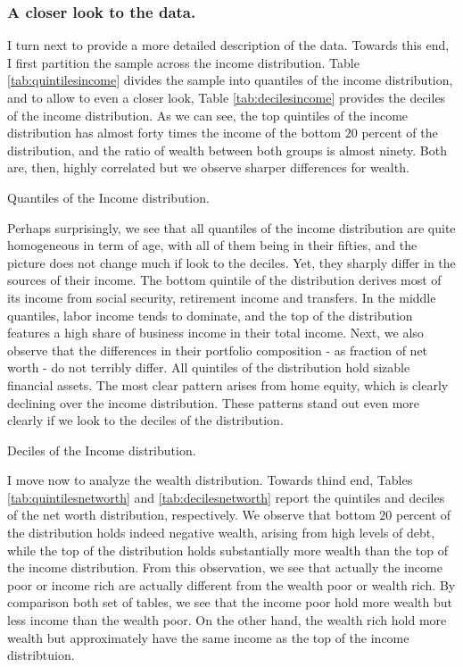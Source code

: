 \documentclass[11pt, a4paper, leqno]{article}
\begin{document}
\subsubsection*{A closer look to the data.}

I turn next to provide a more detailed description of the data. Towards this end, I first partition the sample across the income distribution. Table \ref*{tab:quintilesincome} divides the sample into quantiles of the income distribution, and to allow to even a closer look, Table \ref*{tab:decilesincome} provides the deciles of the income distribution. As we can see, the top quintiles of the income distribution has almost forty times the income of the bottom $20$ percent of the distribution, and the ratio of wealth between both groups is almost ninety. Both are, then, highly correlated but we observe sharper differences for wealth.

\begin{table}[H]
    \caption{Quantiles of the Income distribution.}
    \resizebox{\textwidth}{!}{}
    \label{tab:quintilesincome}
\end{table}

Perhaps surprisingly, we see that all quantiles of the income distribution are quite homogeneous in term of age, with all of them being in their fifties, and the picture does not change much if look to the deciles. Yet, they sharply differ in the sources of their income. The bottom quintile of the distribution derives most of its income from social security, retirement income and transfers. In the middle quantiles, labor income tends to dominate, and the top of the distribution features a high share of business income in their total income. Next, we also observe that the differences in their portfolio composition - as fraction of net worth - do not terribly differ. All quintiles of the distribution hold sizable financial assets. The most clear pattern arises from home equity, which is clearly declining over the income distribution. These patterns stand out even more clearly if we look to the deciles of the distribution. 

\begin{table}[H]
    \caption{Deciles of the Income distribution.}
    \resizebox{\textwidth}{!}{}
    \label{tab:decilesincome}
\end{table}

I move now to analyze the wealth distribution. Towards thind end, Tables \ref*{tab:quintilesnetworth} and \ref*{tab:decilesnetworth} report the quintiles and deciles of the net worth distribution, respectively. We observe that bottom $20$ percent of the distribution holds indeed negative wealth, arising from high levels of debt, while the top of the distribution holds substantially more wealth than the top of the income distribution. From this observation, we see that actually the income poor or income rich are actually different from the wealth poor or wealth rich. By comparison both set of tables, we see that the income poor hold more wealth but less income than the wealth poor. On the other hand, the wealth rich hold more wealth but approximately have the same income as the top of the income distribtuion.
\end{document}
